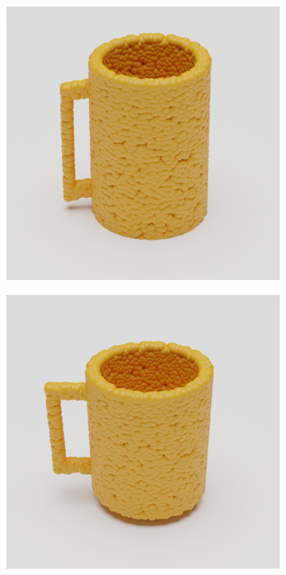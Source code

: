 \documentclass{article}
\begin{document}
\begin{figure}
\begin{subfigure}[b]{0.19\textwidth}
        \includegraphics[width=\textwidth]{figures/blender/warp3/12.png}
    \end{subfigure}
    \begin{subfigure}[b]{0.19\textwidth}
        \includegraphics[width=\textwidth]{figures/blender/warp3/13.png}

\end{subfigure}
\end{figure}
\end{document}
